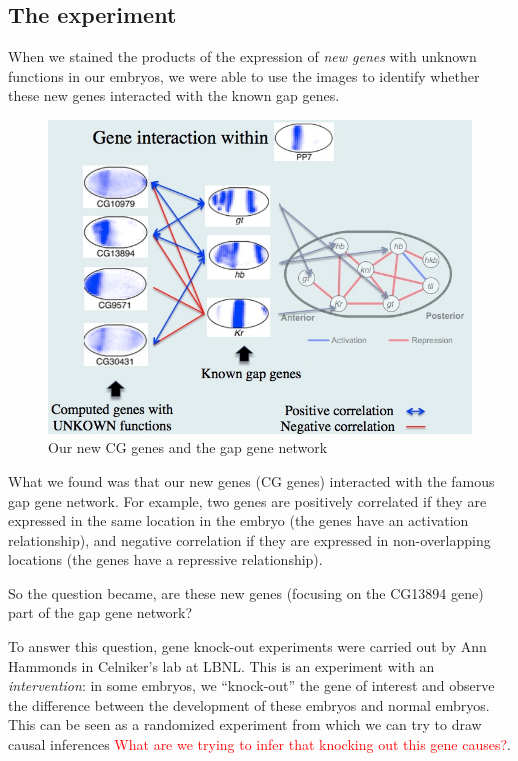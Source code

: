\subsection*{The experiment}

When we stained the products of the expression of \emph{new genes} with unknown functions in our embryos, we were able to use the images to identify whether these new genes interacted with the known gap genes.


\begin{figure}[H]
\begin{center}
\includegraphics[scale=0.5]{embryos1.jpg}
\end{center}
\caption{Our new CG genes and the gap gene network}
\label{fig:embryo_gap}
\end{figure}



What we found was that our new genes (CG genes) interacted with the famous gap gene network. For example, two genes are positively correlated if they are expressed in the same location in the embryo (the genes have an activation relationship), and negative correlation if they are expressed in non-overlapping locations (the genes have a repressive relationship).

So the question became, are these new genes (focusing on the CG13894 gene) part of the gap gene network?

To answer this question, gene knock-out experiments were carried out by Ann Hammonds in Celniker's lab at LBNL. This is an experiment with an \emph{intervention}: in some embryos, we ``knock-out'' the gene of interest and observe the difference between the development of these embryos and normal embryos. This can be seen as a randomized experiment from which we can try to draw causal inferences \textcolor{red}{What are we trying to infer that knocking out this gene causes?}.


